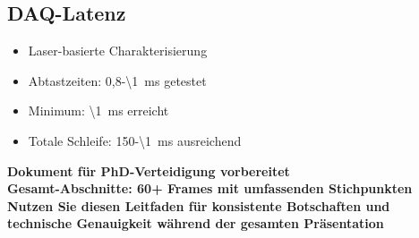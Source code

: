 \documentclass[11pt,a4paper]{article}
\begin{document}
\subsection{DAQ-Latenz}

\begin{itemize}
\item Laser-basierte Charakterisierung
\item Abtastzeiten: 0,8-\SI{\1}{m}s getestet
\item Minimum: \SI{\1}{m}s erreicht
\item Totale Schleife: 150-\SI{\1}{m}s ausreichend
\end{itemize}

\vspace{2em}
\noindent\textbf{Dokument für PhD-Verteidigung vorbereitet}\\
\noindent\textbf{Gesamt-Abschnitte: 60+ Frames mit umfassenden Stichpunkten}\\
\noindent\textbf{Nutzen Sie diesen Leitfaden für konsistente Botschaften und technische Genauigkeit während der gesamten Präsentation}
\end{document}
